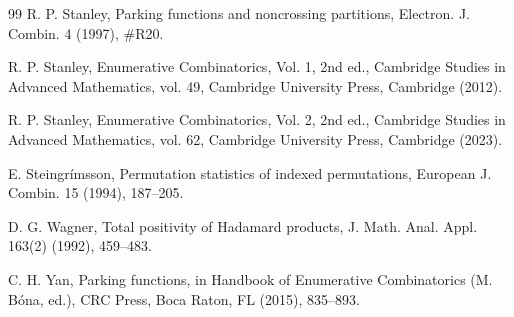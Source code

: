 \documentclass[12pt]{article}
\numberwithin{equation}{section}
\begin{document}
\begin{thebibliography}{99}
R. P. Stanley, Parking functions and noncrossing partitions, Electron. J. Combin. 4 (1997), \#R20.


R. P. Stanley, Enumerative Combinatorics, Vol. 1, 2nd ed., Cambridge Studies in Advanced Mathematics, vol. 49, Cambridge University Press, Cambridge (2012).


R. P. Stanley, Enumerative Combinatorics, Vol. 2, 2nd ed., Cambridge Studies in Advanced Mathematics, vol. 62, Cambridge University Press, Cambridge (2023).

E. Steingr\'imsson, Permutation statistics of indexed permutations, European J. Combin. 15 (1994), 187--205.

D. G. Wagner, Total positivity of Hadamard products, J. Math. Anal. Appl. 163(2) (1992), 459--483. 

C. H. Yan, Parking functions, in Handbook of Enumerative Combinatorics (M. B\'ona, ed.), CRC Press, Boca Raton, FL (2015), 835--893.

\end{thebibliography}
\end{document}
